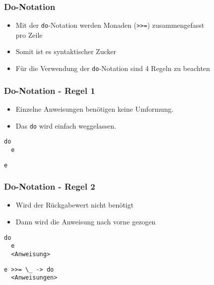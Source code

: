 \documentclass[fleqn,11pt,aspectratio=43]{beamer}
\begin{document}
\begin{frame}
\frametitle{Do-Notation}
\begin{block}{\vspace*{-3ex}}
\begin{itemize}
\item Mit der \lstinline|do|-Notation werden Monaden (\lstinline|>>=|) zusammengefasst \\ pro Zeile
\item Somit ist es syntaktischer Zucker
\item Für die Verwendung der \lstinline|do|-Notation sind 4 Regeln zu beachten
\end{itemize}
\end{block}
\end{frame}

\begin{frame}[fragile]
\frametitle{Do-Notation - Regel 1}
\begin{block}{\vspace*{-3ex}}
\begin{itemize}
\item Einzelne Anweisungen benötigen keine Umformung.
\item Das \lstinline|do| wird einfach weggelassen.
\end{itemize}
\end{block}
\begin{lstlisting}
do 
  e
\end{lstlisting}	
\pause
\begin{lstlisting}
e
\end{lstlisting}	
\end{frame}

\begin{frame}[fragile]
\frametitle{Do-Notation - Regel 2}
\begin{block}{\vspace*{-3ex}}
\begin{itemize}
\item Wird der Rückgabewert nicht benötigt
\item Dann wird die Anweisung nach vorne gezogen
\end{itemize}
\end{block}
\begin{lstlisting}
do 
  e
  <Anweisung>
\end{lstlisting}	
\pause
\begin{lstlisting}
e >>= \_ -> do
  <Anweisungen>
\end{lstlisting}	
\end{frame}
\end{document}
